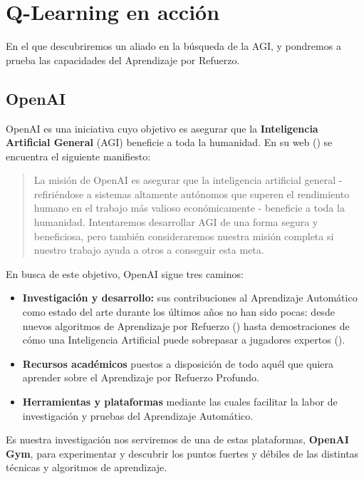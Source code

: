 \chapter{Q-Learning en acción}
\label{cap:q-learning}

En el que descubriremos un aliado en la búsqueda de la AGI, y pondremos a prueba las capacidades del Aprendizaje por Refuerzo.


\section{OpenAI}
OpenAI es una iniciativa cuyo objetivo es asegurar que la \textbf{Inteligencia Artificial General} (AGI) beneficie a toda la humanidad. En su web (\citet{OpenAI_charter}) se encuentra el siguiente manifiesto:

\begin{quote}
    La misión de OpenAI es asegurar que la inteligencia artificial general - refiriéndose a sistemas altamente autónomos que superen el rendimiento humano en el trabajo más valioso económicamente - beneficie a toda la humanidad. Intentaremos desarrollar AGI de una forma segura y beneficiosa, pero también consideraremos nuestra misión completa si nuestro trabajo ayuda a otros a conseguir esta meta. 
\end{quote}

En busca de este objetivo, OpenAI sigue tres caminos:
\begin{itemize}
    \item \textbf{Investigación y desarrollo:} sus contribuciones al Aprendizaje Automático como estado del arte durante los últimos años no han sido pocas: desde nuevos algoritmos de Aprendizaje por Refuerzo (\citet{baselines}) hasta demostraciones de cómo una Inteligencia Artificial puede sobrepasar a jugadores expertos (\citet{OpenAI_dota}).
    \item \textbf{Recursos académicos} \citet{spinningup} puestos a disposición de todo aquél que quiera aprender sobre el Aprendizaje por Refuerzo Profundo.
    \item \textbf{Herramientas y plataformas} mediante las cuales facilitar la labor de investigación y pruebas del Aprendizaje Automático.
\end{itemize}

Es nuestra investigación nos serviremos de una de estas plataformas, \textbf{OpenAI Gym}, para experimentar y descubrir los puntos fuertes y débiles de las distintas técnicas y algoritmos de aprendizaje. 

